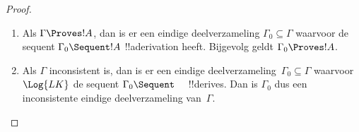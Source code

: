 \documentclass[../../../include/open-logic-section]{subfiles}
\begin{document}
\begin{proof}
  \begin{enumerate}
    \item Als $\Gamma \Proves !A$, dan is er een eindige
      deelverzameling $\Gamma_0 \subseteq \Gamma$ waarvoor de sequent
      $\Gamma_0 \Sequent !A$ !!a{derivation} heeft. Bijgevolg geldt
      $\Gamma_0 \Proves !A$.
    \item Als $\Gamma$ inconsistent is, dan is er een eindige
      deelverzameling~$\Gamma_0 \subseteq \Gamma$ waarvoor $\Log{LK}$
      de sequent $\Gamma_0 \Sequent \quad$ !!{derive}s. Dan is
      $\Gamma_0$ dus een inconsistente eindige deelverzameling
      van~$\Gamma$.
  \end{enumerate}
\end{proof}
\end{document}
